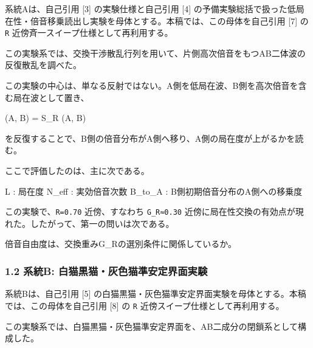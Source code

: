 \documentclass[
]{article}
\newenvironment{Shaded}{}{}
\newcommand{\NormalTok}[1]{#1}
\begin{document}
系統Aは、自己引用 {[}3{]} の実験仕様と自己引用 {[}4{]}
の予備実験総括で扱った低局在性・倍音移乗読出し実験を母体とする。本稿では、この母体を自己引用
{[}7{]} の \texttt{R} 近傍斉一スイープ仕様として再利用する。

この実験系では、交換干渉散乱行列を用いて、片側高次倍音をもつAB二体波の反復散乱を調べた。

この実験の中心は、単なる反射ではない。A側を低局在波、B側を高次倍音を含む局在波として置き、

\begin{Shaded}
\begin{Highlighting}[]
\NormalTok{(A\textquotesingle{}, B\textquotesingle{}) = S\_R (A, B)}
\end{Highlighting}
\end{Shaded}

を反復することで、B側の倍音分布がA側へ移り、A側の局在度が上がるかを読む。

ここで評価したのは、主に次である。

\begin{Shaded}
\begin{Highlighting}[]
\NormalTok{L        : 局在度}
\NormalTok{N\_eff    : 実効倍音次数}
\NormalTok{B\_to\_A   : B側初期倍音分布のA側への移乗度}
\end{Highlighting}
\end{Shaded}

この実験で、\texttt{R=0.70} 近傍、すなわち \texttt{G\_R≈0.30}
近傍に局在性交換の有効点が現れた。したがって、第一の問いは次である。

\begin{Shaded}
\begin{Highlighting}[]
\NormalTok{倍音自由度は、交換重みG\_Rの選別条件に関係しているか。}
\end{Highlighting}
\end{Shaded}

\subsubsection{1.2 系統B:
白猫黒猫・灰色猫準安定界面実験}\label{ux7cfbux7d71b-ux767dux732bux9ed2ux732bux7070ux8272ux732bux6e96ux5b89ux5b9aux754cux9762ux5b9fux9a13}

系統Bは、自己引用 {[}5{]}
の白猫黒猫・灰色猫準安定界面実験を母体とする。本稿では、この母体を自己引用
{[}8{]} の \texttt{R} 近傍スイープ仕様として再利用する。

この実験系では、白猫黒猫・灰色猫準安定界面を、AB二成分の閉鎖系として構成した。
\end{document}
